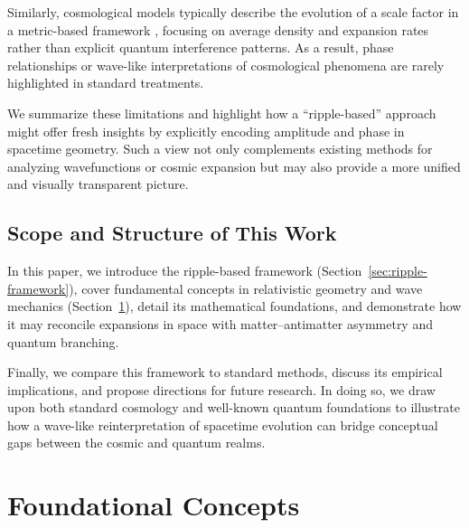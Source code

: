 \documentclass{article}
\begin{document}
Similarly, cosmological models typically describe the evolution of a scale 
factor in a metric-based framework \cite{misner1973}, focusing on average 
density and expansion rates rather than explicit quantum interference 
patterns. As a result, phase relationships or wave-like interpretations 
of cosmological phenomena are rarely highlighted in standard treatments. 

We summarize these limitations and highlight how a ``ripple-based'' 
approach might offer fresh insights by explicitly encoding amplitude and 
phase in spacetime geometry. Such a view not only complements existing 
methods for analyzing wavefunctions or cosmic expansion but may also 
provide a more unified and visually transparent picture.

\subsection{Scope and Structure of This Work}
\label{subsec:scope-structure}
In this paper, we introduce the ripple-based framework (Section~\ref{sec:ripple-framework}), 
cover fundamental concepts in relativistic geometry and wave mechanics 
(Section~\ref{sec:foundational-concepts}), detail its mathematical 
foundations, and demonstrate how it may reconcile expansions in space 
with matter--antimatter asymmetry and quantum branching. 

Finally, we compare this framework to standard methods, discuss its 
empirical implications, and propose directions for future research. 
In doing so, we draw upon both standard cosmology \cite{rindler1977essential} 
and well-known quantum foundations \cite{griffiths2005introduction, 
feynmanlectures, everett1957} to illustrate how a wave-like reinterpretation 
of spacetime evolution can bridge conceptual gaps between the cosmic 
and quantum realms.

\section{Foundational Concepts}
\label{sec:foundational-concepts}
\end{document}
